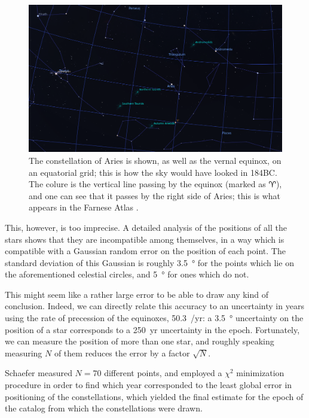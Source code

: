 \documentclass[main.tex]{subfiles}
\begin{document}
\begin{figure}[ht]
\centering
\includegraphics[width=\textwidth]{figures/aries_on_colure_184_BC.png}
\caption{The constellation of Aries is shown, as well as the vernal equinox, on an equatorial grid; this is how the sky would have looked in 184BC. The colure is the vertical line passing by the equinox (marked as \(\aries\)), and one can see that it passes by the right side of Aries; this is what appears in the Farnese Atlas \cite[]{stellariumcontributorsStellariumAstronomySoftware2020}.}
\label{fig:aries}
\end{figure}

This, however, is too imprecise. A detailed analysis of the positions of all the stars shows that they are incompatible among themselves, in a way which is compatible with a Gaussian random error on the position of each point. The standard deviation of this Gaussian is roughly \SI{3.5}{\degree} for the points which lie on the aforementioned celestial circles, and \SI{5}{\degree} for ones which do not. 

This might seem like a rather large error to be able to draw any kind of conclusion.
Indeed, we can directly relate this accuracy to an uncertainty in years using the rate of precession of the equinoxes, \SI{50.3}{\arcsec / yr}: a \SI{3.5}{\degree} uncertainty on the position of a star corresponds to a \SI{250}{yr} uncertainty in the epoch. 
Fortunately, we can measure the position of more than one star, and roughly speaking measuring \(N\) of them reduces the error by a factor \(\sqrt{N}\). 

Schaefer measured \(N = 70\) different points, and employed a \(\chi^2\) minimization procedure in order to find which year corresponded to the least global error in positioning of the constellations, which yielded the final estimate for the epoch of the catalog from which the constellations were drawn. 
\end{document}
